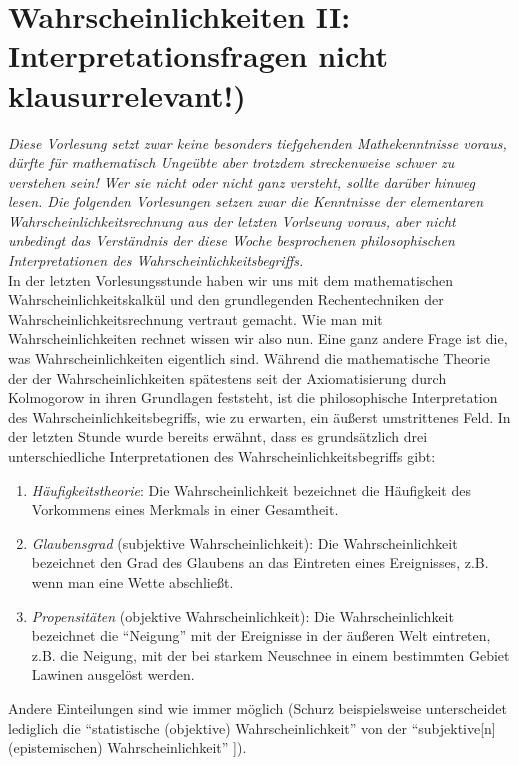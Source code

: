 
\section{Wahrscheinlichkeiten II: Interpretationsfragen {\bf nicht klausurrelevant!})}
\label{philosophischeWahrscheinlichkeitstheorien}

{\em Diese Vorlesung setzt zwar keine besonders tiefgehenden Mathekenntnisse
voraus, dürfte für mathematisch Ungeübte aber trotzdem streckenweise schwer zu
verstehen sein! Wer sie nicht oder nicht ganz versteht, sollte darüber hinweg
lesen. Die folgenden Vorlesungen setzen zwar die Kenntnisse der elementaren
Wahrscheinlichkeitsrechnung aus der letzten Vorlseung voraus, aber nicht
unbedingt das Verständnis der diese Woche besprochenen philosophischen
Interpretationen des Wahrscheinlichkeitsbegriffs.}
{ }\\

In der letzten Vorlesungsstunde haben wir uns mit dem mathematischen
Wahrscheinlichkeitskalkül und den grundlegenden Rechentechniken der
Wahrscheinlichkeitsrechnung vertraut gemacht. Wie man mit Wahrscheinlichkeiten
rechnet wissen wir also nun. Eine ganz andere Frage ist die, was
Wahrscheinlichkeiten eigentlich sind. Während die mathematische Theorie der der
Wahrscheinlichkeiten spätestens seit der Axiomatisierung durch Kolmogorow in
ihren Grundlagen feststeht, ist die philosophische Interpretation des
Wahrscheinlichkeitsbegriffs, wie zu erwarten, ein äußerst umstrittenes Feld. In
der letzten Stunde wurde bereits erwähnt, dass es grundsätzlich drei
unterschiedliche Interpretationen des Wahrscheinlichkeitsbegriffs gibt:
\begin{enumerate}
  \item {\em Häufigkeitstheorie}: Die Wahrscheinlichkeit bezeichnet die
  Häufigkeit des Vorkommens eines Merkmals in einer Gesamtheit.
  \item {\em Glaubensgrad} (subjektive Wahrscheinlichkeit): Die
  Wahrscheinlichkeit bezeichnet den Grad des Glaubens an das Eintreten eines
  Ereignisses, z.B. wenn man eine Wette abschließt.
  \item {\em Propensitäten} (objektive Wahrscheinlichkeit): Die
  Wahrscheinlichkeit bezeichnet die "`Neigung"' mit der Ereignisse in der
  äußeren Welt eintreten, z.B. die Neigung, mit der bei starkem Neuschnee in
  einem bestimmten Gebiet Lawinen ausgelöst werden.
\end{enumerate}
Andere Einteilungen sind wie immer möglich (Schurz beispielsweise
unterscheidet lediglich die "`statistische (objektive) Wahrscheinlichkeit"'
von der "`subjektive[n] (epistemischen) Wahrscheinlichkeit"'
\cite[S.99]{schurz:2006}]). 


